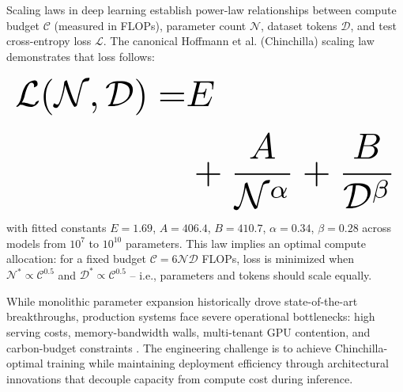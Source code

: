 \documentclass[11pt,a4paper]{article}
\begin{document}
Scaling laws in deep learning establish power-law relationships between compute budget $\mathcal{C}$ (measured in FLOPs), parameter count $\mathcal{N}$, dataset tokens $\mathcal{D}$, and test cross-entropy loss $\mathcal{L}$. The canonical Hoffmann et al. (Chinchilla) scaling law demonstrates that loss follows:



























\begin{equation}
\resizebox{\columnwidth}{!}{$\displaystyle
\begin{aligned}
\mathcal{L}(\mathcal{N}, \mathcal{D}) = & E \\
& + \frac{A}{\mathcal{N}^\alpha} + \frac{B}{\mathcal{D}^\beta}
\end{aligned}
$}
\end{equation}



























with fitted constants $E = 1.69$, $A = 406.4$, $B = 410.7$, $\alpha = 0.34$, $\beta = 0.28$ across models from $10^7$ to $10^{10}$ parameters. This law implies an optimal compute allocation: for a fixed budget $\mathcal{C} = 6\mathcal{N}\mathcal{D}$ FLOPs, loss is minimized when $\mathcal{N}^* \propto \mathcal{C}^{0.5}$ and $\mathcal{D}^* \propto \mathcal{C}^{0.5}$ -- i.e., parameters and tokens should scale equally.

While monolithic parameter expansion historically drove state-of-the-art breakthroughs, production systems face severe operational bottlenecks: high serving costs, memory-bandwidth walls, multi-tenant GPU contention, and carbon-budget constraints \cite{arxiv_2406_00584,crossref_10_1109_access_2026_3656309}. The engineering challenge is to achieve Chinchilla-optimal training while maintaining deployment efficiency through architectural innovations that decouple capacity from compute cost during inference.
\end{document}
